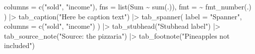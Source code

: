 \documentclass[
  letterpaper,
  DIV=11,
  numbers=noendperiod]{scrartcl}
\newenvironment{Shaded}{\begin{snugshade}}{\end{snugshade}}
\newcommand{\AttributeTok}[1]{\textcolor[rgb]{0.40,0.45,0.13}{#1}}
\newcommand{\FunctionTok}[1]{\textcolor[rgb]{0.28,0.35,0.67}{#1}}
\newcommand{\NormalTok}[1]{\textcolor[rgb]{0.00,0.23,0.31}{#1}}
\newcommand{\SpecialCharTok}[1]{\textcolor[rgb]{0.37,0.37,0.37}{#1}}
\newcommand{\StringTok}[1]{\textcolor[rgb]{0.13,0.47,0.30}{#1}}
\begin{document}
\begin{Shaded}
\begin{Highlighting}[]
    \AttributeTok{columns =} \FunctionTok{c}\NormalTok{(}\StringTok{"sold"}\NormalTok{, }\StringTok{"income"}\NormalTok{),}
    \AttributeTok{fns =} \FunctionTok{list}\NormalTok{(Sum }\SpecialCharTok{\textasciitilde{}} \FunctionTok{sum}\NormalTok{(.)),}
    \AttributeTok{fmt =} \SpecialCharTok{\textasciitilde{}} \FunctionTok{fmt\_number}\NormalTok{(.)}
\NormalTok{  ) }\SpecialCharTok{|\textgreater{}}
  \FunctionTok{tab\_caption}\NormalTok{(}\StringTok{"Here be caption text"}\NormalTok{) }\SpecialCharTok{|\textgreater{}}
  \FunctionTok{tab\_spanner}\NormalTok{(}
    \AttributeTok{label =} \StringTok{"Spanner"}\NormalTok{,}
    \AttributeTok{columns =} \FunctionTok{c}\NormalTok{(}\StringTok{"sold"}\NormalTok{, }\StringTok{"income"}\NormalTok{)}
\NormalTok{  ) }\SpecialCharTok{|\textgreater{}}
  \FunctionTok{tab\_stubhead}\NormalTok{(}\StringTok{"Stubhead label"}\NormalTok{) }\SpecialCharTok{|\textgreater{}}
  \FunctionTok{tab\_source\_note}\NormalTok{(}\StringTok{"Source: the pizzaria"}\NormalTok{) }\SpecialCharTok{|\textgreater{}}
  \FunctionTok{tab\_footnote}\NormalTok{(}\StringTok{"Pineapples not included"}\NormalTok{)}
\end{Highlighting}
\end{Shaded}
\end{document}
